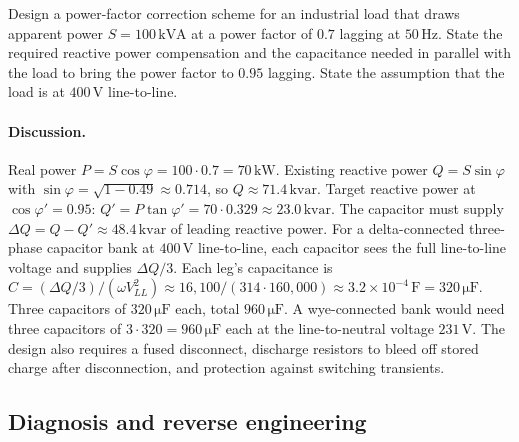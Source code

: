 \begin{exercise}
Design a power-factor correction scheme for an industrial load
that draws apparent power $S = 100 \,\si{\kilo\text{VA}}$ at a
power factor of $0.7$ lagging at $50 \,\si{\hertz}$. State the
required reactive power compensation and the capacitance needed
in parallel with the load to bring the power factor to $0.95$
lagging. State the assumption that the load is at $400 \,\si
{\volt}$ line-to-line.

\paragraph{Discussion.}
Real power $P = S\cos\varphi = 100 \cdot 0.7 = 70\,\si{\kilo
\watt}$. Existing reactive power $Q = S\sin\varphi$ with
$\sin\varphi = \sqrt{1 - 0.49} \approx 0.714$, so $Q \approx
71.4\,\si{\kilo\text{var}}$. Target reactive power at $\cos\varphi'
= 0.95$: $Q' = P\tan\varphi' = 70 \cdot 0.329 \approx 23.0\,
\si{\kilo\text{var}}$. The capacitor must supply $\Delta Q = Q -
Q' \approx 48.4\,\si{\kilo\text{var}}$ of leading reactive power.
For a delta-connected three-phase capacitor bank at $400\,\si
{\volt}$ line-to-line, each capacitor sees the full
line-to-line voltage and supplies $\Delta Q/3$. Each leg's
capacitance is $C = (\Delta Q / 3) / (\omega V_{LL}^{2})
\approx 16{,}100 / (314 \cdot 160{,}000) \approx 3.2 \times
10^{-4}\,\si{\farad} = 320\,\si{\micro\farad}$. Three capacitors of
$320\,\si{\micro\farad}$ each, total $960\,\si{\micro\farad}$.
A wye-connected bank would need three capacitors of $3 \cdot
320 = 960\,\si{\micro\farad}$ each at the line-to-neutral voltage
$231\,\si{\volt}$. The design also requires a fused disconnect,
discharge resistors to bleed off stored charge after
disconnection, and protection against switching transients.
\end{exercise}

\subsection*{Diagnosis and reverse engineering}

